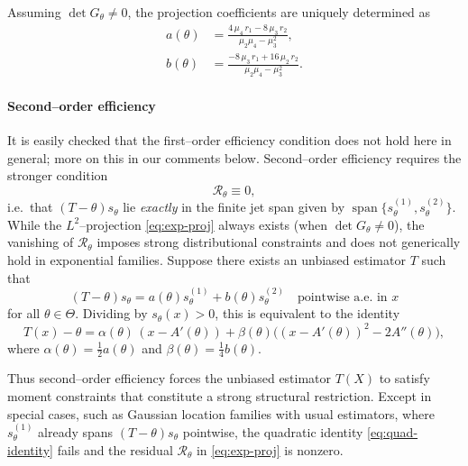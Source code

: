 \documentclass[3p,times]{elsarticle}
\begin{document}
Assuming $\det G_\theta\neq0$, the projection coefficients are uniquely determined as
\begin{align}
a(\theta)
&=
\frac{4\,\mu_4\,r_1 - 8\,\mu_3\,r_2}{\mu_2\mu_4-\mu_3^2},
\nonumber\\[4pt]
b(\theta)
&=
\frac{-8\,\mu_3\,r_1 + 16\,\mu_2\,r_2}{\mu_2\mu_4-\mu_3^2}.
\label{eq:ab-sol}
\end{align}

\paragraph{Second--order efficiency}
It is easily checked that the first--order efficiency condition does not hold here in general; more on this in our comments below. Second--order efficiency requires the stronger condition
\[
\mathcal{R}_\theta\equiv0,
\]
i.e.\ that $(T-\theta)s_\theta$ lie \emph{exactly} in the finite jet span given by 
$\operatorname{span}\{s_\theta^{(1)},s_\theta^{(2)}\}$.
While the $L^2$--projection \eqref{eq:exp-proj} always exists (when
$\det G_\theta\neq0$), the vanishing of $\mathcal{R}_\theta$ imposes strong
distributional constraints and does not generically hold in exponential families.
Suppose there exists an unbiased estimator $T$ such that
\[
(T-\theta)s_\theta
=
a(\theta)s_\theta^{(1)} + b(\theta)s_\theta^{(2)}
\quad\text{pointwise a.e. in \(x\)}
\]
for all $\theta\in\Theta$.
Dividing by $s_\theta(x)>0$, this is equivalent to the identity
\begin{equation}
T(x)-\theta
=
\alpha(\theta)\,(x-A'(\theta))
+
\beta(\theta)\big((x-A'(\theta))^2-2A''(\theta)\big),
\label{eq:quad-identity}
\end{equation}
where $\alpha(\theta)=\tfrac12 a(\theta)$ and
$\beta(\theta)=\tfrac14 b(\theta)$.

Thus second--order efficiency forces the unbiased estimator $T(X)$ to satisfy moment constraints
that constitute a strong structural restriction.
Except in special cases, such as Gaussian location families with usual estimators, where
$s_\theta^{(1)}$ already spans $(T-\theta)s_\theta$ pointwise,
the quadratic identity \eqref{eq:quad-identity} fails and the residual
$\mathcal{R}_\theta$ in \eqref{eq:exp-proj} is nonzero.
\end{document}
